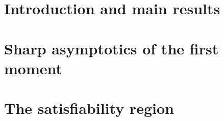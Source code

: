 \documentclass[letterpaper,11pt]{article}
\begin{document}
\setcounter{tocdepth}{2}
\tableofcontents

\section{Introduction and main results}\label{sec:intro}


\section{Sharp asymptotics of the first moment}\label{sec:1st_moment}


\section{The satisfiability region}\label{sec:2nd_moment}



\printbibliography
\end{document}
